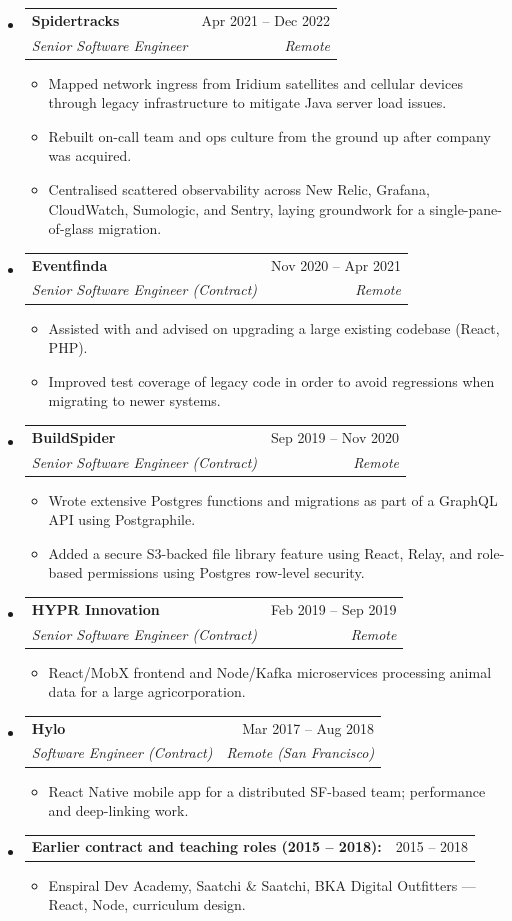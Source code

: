 \documentclass[12pt]{article}
\makeatletter
\def \entryspacing {0em}
\newcommand{\resumeEntryStart}{\begin{itemize}[leftmargin=2.5mm]}
\newcommand{\resumeEntryEnd}{\end{itemize}\vspace{\entryspacing}}
\newcommand{\resumeItemListStart}{\begin{itemize}[leftmargin=4.5mm]}
\newcommand{\resumeItemListEnd}{\end{itemize}}
\newcommand{\resumeItem}[1]{
  \item\small{
    {#1 \vspace{-0.9ex}}
  }
}
\newcommand{\resumeEntryTSDL}[4]{
  \vspace{-0.5ex}\item[]
    \begin{tabularx}{0.97\textwidth}{X@{\hspace{5em}}r}
      \textbf{\color{primary}#1} & {\firabook\color{muted}\small#2} \\
      \textit{\color{accent}\small#3} & \textit{\color{muted}\small#4} \\
    \end{tabularx}\vspace{-0.9ex}
}
\newcommand{\resumeEntryTD}[2]{
  \vspace{-0.5ex}\item[]
    \begin{tabularx}{0.97\textwidth}{X@{\hspace{5em}}r}
      \textbf{\color{primary}#1} & {\firabook\color{muted}\small#2} \\
    \end{tabularx}\vspace{-0.9ex}
}
\makeatother
\begin{document}
  \resumeEntryStart
    \resumeEntryTSDL
      {Spidertracks}{Apr 2021 -- Dec 2022}
      {Senior Software Engineer}{Remote}
    \resumeItemListStart
      \resumeItem {Mapped network ingress from Iridium satellites and cellular devices through legacy infrastructure to mitigate Java server load issues.}
      \resumeItem {Rebuilt on-call team and ops culture from the ground up after company was acquired.}
      \resumeItem {Centralised scattered observability across New Relic, Grafana, CloudWatch, Sumologic, and Sentry, laying groundwork for a single-pane-of-glass migration.}
    \resumeItemListEnd
  \resumeEntryEnd

  \resumeEntryStart
    \resumeEntryTSDL
      {Eventfinda}{Nov 2020 -- Apr 2021}
      {Senior Software Engineer (Contract)}{Remote}
    \resumeItemListStart
        \resumeItem {Assisted with and advised on upgrading a large existing codebase (React, PHP).}
        \resumeItem {Improved test coverage of legacy code in order to avoid regressions when migrating to newer systems.}
    \resumeItemListEnd
  \resumeEntryEnd

  \resumeEntryStart
    \resumeEntryTSDL
      {BuildSpider}{Sep 2019 -- Nov 2020}
      {Senior Software Engineer (Contract)}{Remote}
    \resumeItemListStart
      \resumeItem {Wrote extensive Postgres functions and migrations as part of a GraphQL API using Postgraphile.}
      \resumeItem {Added a secure S3-backed file library feature using React, Relay, and role-based permissions using Postgres row-level security.}
    \resumeItemListEnd
  \resumeEntryEnd

  \resumeEntryStart
    \resumeEntryTSDL
      {HYPR Innovation}{Feb 2019 -- Sep 2019}
      {Senior Software Engineer (Contract)}{Remote}
    \resumeItemListStart
      \resumeItem {React/MobX frontend and Node/Kafka microservices processing animal data for a large agricorporation.}
    \resumeItemListEnd
  \resumeEntryEnd

  \resumeEntryStart
    \resumeEntryTSDL
      {Hylo}{Mar 2017 -- Aug 2018}
      {Software Engineer (Contract)}{Remote (San Francisco)}
    \resumeItemListStart
      \resumeItem {React Native mobile app for a distributed SF-based team; performance and deep-linking work.}
    \resumeItemListEnd
  \resumeEntryEnd

  \resumeEntryStart
    \resumeEntryTD
      {Earlier contract and teaching roles (2015 -- 2018):}{2015 -- 2018}
    \resumeItemListStart
      \resumeItem {Enspiral Dev Academy, Saatchi \& Saatchi, BKA Digital Outfitters --- React, Node, curriculum design.}
    \resumeItemListEnd
  \resumeEntryEnd
\end{document}
